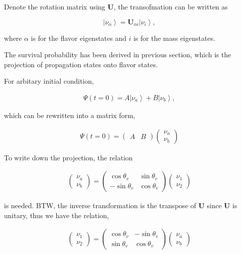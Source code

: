 \documentclass{tufte-handout}
\newcommand{\ket}[1]{\left| #1\right\rangle}
\begin{document}
Denote the rotation matrix using $\mathbf U$, the transofmation can be written as

\begin{equation}
\ket{\nu_{\alpha}} = \mathbf U_{\alpha i} \ket{\nu_i},
\end{equation}

where $\alpha$ is for the flavor eigenstates and $i$ is for the mass eigenstates.

The survival probability has been derived in previous section, which is the projection of propagation states onto flavor states.

For arbitary initial condition,

\begin{align}
    \Psi(t=0)= A \ket{\nu_a} + B \ket{\nu_b}, 
\end{align}

which can be rewritten into a matrix form,

\begin{align}
    \Psi(t=0) = \begin{pmatrix}
    A & B 
\end{pmatrix}\begin{pmatrix}
    \nu_a \\
    \nu_b 
\end{pmatrix}
\end{align}



To write down the projection, the relation

\begin{align}
    \begin{pmatrix}
        \nu_a \\
        \nu_b
    \end{pmatrix} = \begin{pmatrix}
        \cos\theta_v & \sin\theta_v \\ -\sin\theta_v  & \cos\theta_v
\end{pmatrix} \begin{pmatrix}  \nu_1 \\ \nu_2
\end{pmatrix}
\end{align}

is needed. BTW, the inverse transformation is the transpose of $\mathbf U$ since $\mathbf U$ is unitary, thus we have the relation,

\begin{align}
\begin{pmatrix}
    \nu_1 \\
    \nu_2
\end{pmatrix} = \begin{pmatrix}
\cos\theta_v & -\sin\theta_v \\
\sin\theta_v & \cos\theta_v
\end{pmatrix} \begin{pmatrix}
    \nu_a \\
    \nu_b
\end{pmatrix}
\end{align}
\end{document}
